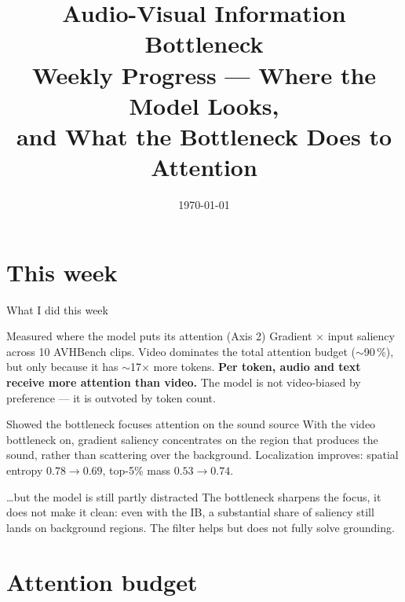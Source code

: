 \documentclass[10pt,aspectratio=169]{beamer}
\title[av\_ib Weekly Progress]{Audio-Visual Information Bottleneck\\
       \normalfont\normalsize Weekly Progress --- Where the Model Looks,\\
       and What the Bottleneck Does to Attention}
\subtitle{}
\author{}
\institute{}
\date{\today}
\begin{document}
\frame{\titlepage}

\section{This week}

\begin{frame}{What I did this week}

\begin{block}{Measured where the model puts its attention (Axis 2)}
  Gradient $\times$ input saliency across 10 AVHBench clips. Video dominates the
  total attention budget ($\sim$90\,\%), but only because it has $\sim$17$\times$
  more tokens. \textbf{Per token, audio and text receive more attention than
  video.} The model is not video-biased by preference --- it is outvoted by token
  count.
\end{block}

\begin{block}{Showed the bottleneck focuses attention on the sound source}
  With the video bottleneck on, gradient saliency concentrates on the region that
  produces the sound, rather than scattering over the background. Localization
  improves: spatial entropy $0.78\!\to\!0.69$, top-5\% mass $0.53\!\to\!0.74$.
\end{block}

\begin{block}{\ldots but the model is still partly distracted}
  The bottleneck sharpens the focus, it does not make it clean: even with the IB,
  a substantial share of saliency still lands on background regions. The filter
  helps but does not fully solve grounding.
\end{block}

\end{frame}

\section{Attention budget}
\end{document}
